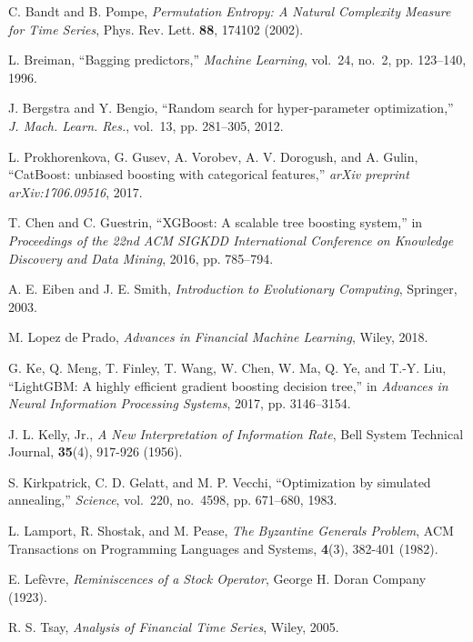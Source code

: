 \documentclass[10pt]{article}
\begin{document}
\begin{thebibliography}{99}

C. Bandt and B. Pompe,
\textit{Permutation Entropy: A Natural Complexity Measure for Time Series},
Phys. Rev. Lett. \textbf{88}, 174102 (2002).

L. Breiman, “Bagging predictors,” \emph{Machine Learning},
vol.~24, no.~2, pp. 123--140, 1996.

J. Bergstra and Y. Bengio, “Random search for hyper‑parameter optimization,” \emph{J. Mach. Learn. Res.}, vol.~13, pp. 281–305, 2012.

L. Prokhorenkova, G. Gusev, A. Vorobev, A. V. Dorogush, and A. Gulin, “CatBoost: unbiased boosting with categorical features,” \emph{arXiv preprint arXiv:1706.09516}, 2017.

T. Chen and C. Guestrin, “XGBoost: A scalable tree boosting system,” in \emph{Proceedings of the 22nd ACM SIGKDD International Conference on Knowledge Discovery and Data Mining}, 2016, pp. 785--794.

A. E. Eiben and J. E. Smith, \textit{Introduction to Evolutionary Computing}, Springer, 2003.

M. Lopez de Prado, \textit{Advances in Financial Machine Learning}, Wiley, 2018.

G. Ke, Q. Meng, T. Finley, T. Wang, W. Chen, W. Ma, Q. Ye, and T.-Y. Liu, “LightGBM: A highly efficient gradient boosting decision tree,” in \emph{Advances in Neural Information Processing Systems}, 2017, pp. 3146--3154.

J. L. Kelly, Jr., \textit{A New Interpretation of Information Rate}, Bell System Technical Journal, \textbf{35}(4), 917-926 (1956).

S. Kirkpatrick, C. D. Gelatt, and M. P. Vecchi, “Optimization by simulated annealing,” \emph{Science}, vol.~220, no.~4598, pp. 671–680, 1983.

L. Lamport, R. Shostak, and M. Pease, \textit{The Byzantine Generals Problem}, ACM Transactions on Programming Languages and Systems, \textbf{4}(3), 382-401 (1982).

E. Lefèvre, \textit{Reminiscences of a Stock Operator}, George H. Doran Company (1923).

R. S. Tsay, \textit{Analysis of Financial Time Series}, Wiley, 2005.


\end{thebibliography}
\end{document}
